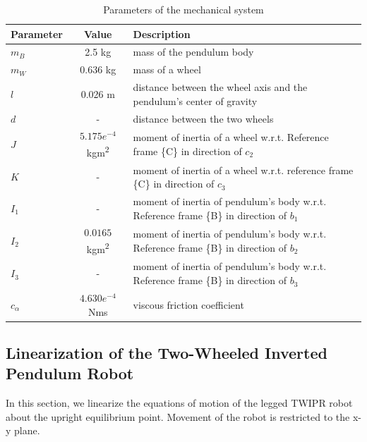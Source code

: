 	\begin{table}[h]
		\centering
		\caption{Parameters of the mechanical system}
		\label{tab:parameters}
		\begin{tabular}{lcl}
			\toprule
			Parameter & Value & Description \\
			\midrule
			$m_B$ & 2.5 kg & mass of the pendulum body \\
			$m_W$ & 0.636 kg & mass of a wheel \\
			$l$ & 0.026 m & distance between the wheel axis and the pendulum's center of gravity \\
			$d$ & - & distance between the two wheels \\
			$J$ & \(5.175 e^{-4}\) kgm\textsuperscript{2} & moment of inertia of a wheel w.r.t. Reference frame \{C\} in direction of \(c_2\) \\
			$K$ & - & moment of inertia of a wheel w.r.t. reference frame \{C\} in direction of \(c_3\) \\
			$I_1$ & - & moment of inertia of pendulum's body w.r.t. Reference frame \{B\} in direction of \(b_1\) \\
			$I_2$ & \(0.0165\) kgm\textsuperscript{2} & moment of inertia of pendulum's body w.r.t. Reference frame \{B\} in direction of \(b_2\) \\
			$I_3$ & - & moment of inertia of pendulum's body w.r.t. Reference frame \{B\} in direction of \(b_3\) \\
			$c_\alpha$ & \(4.630 e^{-4}\) Nms & viscous friction coefficient \\
			\bottomrule
		\end{tabular}
	\end{table}
	
	
\newpage
\subsection{Linearization of the Two-Wheeled Inverted Pendulum Robot}
In this section, we linearize the equations of motion of the legged TWIPR robot about the upright equilibrium point. Movement of the robot is restricted to the x-y plane.

